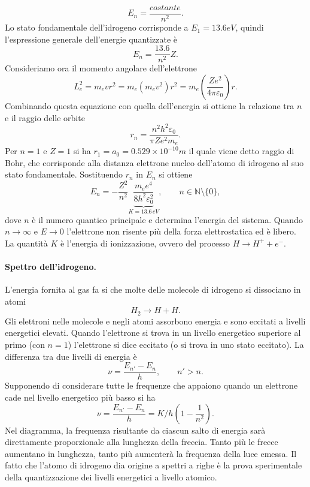 \begin{equation}
    E_n=\frac{costante}{n^2}.
\end{equation}
Lo stato fondamentale dell'idrogeno corrisponde a $E_1=13.6 eV$, quindi l'espressione generale dell'energie quantizzate è
\begin{equation}
    E_n=\frac{13.6}{n^2}Z.
\end{equation}
Consideriamo ora il momento angolare dell'elettrone
\begin{equation}
    L_e^2={m_evr}^2=m_e\left(m_ev^2\right)r^2=m_e\left(\frac{Ze^2}{4\pi\varepsilon_0}\right)r.
\end{equation}
Combinando questa equazione con quella dell'energia si ottiene la relazione tra $n$ e il raggio delle orbite
\begin{equation}
    r_n=\frac{n^2h^2\varepsilon_0}{\pi Ze^2m_e}.
\end{equation}
Per $n=1$ e $Z=1$ si ha $r_1=a_0=0.529\times10^{-10} m$ il quale viene detto raggio di Bohr, che corrisponde alla distanza elettrone nucleo dell'atomo di idrogeno al suo stato fondamentale. Sostituendo $r_n$ in $E_n$ si ottiene
\begin{equation}
    E_n=-\frac{Z^2}{n^2}\underbrace{\frac{m_ee^4}{8h^2\varepsilon_0^2}}_{K=13.6\,eV},\qquad n\in\mathbb{N}\setminus\{0\},
\end{equation}
dove $n$ è il numero quantico principale e determina l'energia del sistema. Quando $n\to\infty$ e $E\to0$ l'elettrone non risente più della forza elettrostatica ed è libero. La quantità $K$ è l'energia di ionizzazione, ovvero del processo $H\to H^+ + e^-$. 
\paragraph{Spettro dell'idrogeno.} L'energia fornita al gas fa si che molte delle molecole di idrogeno si dissociano in atomi
\begin{equation}
    H_2\to H+H.
\end{equation}
Gli elettroni nelle molecole e negli atomi assorbono energia e sono eccitati a livelli energetici elevati. Quando l'elettrone si trova in un livello energetico superiore al primo (con $n=1$) l'elettrone si dice eccitato (o si trova in uno stato eccitato). La differenza tra due livelli di energia è
\begin{equation}
    \nu=\frac{E_{n'}-E_n}{h},\qquad n'>n.
\end{equation}
Supponendo di considerare tutte le frequenze che appaiono quando un elettrone cade nel livello energetico più basso si ha
\begin{equation}
    \nu=\frac{E_{n'}-E_n}{h}=K/h \left(1-\frac{1}{n^2}\right).
\end{equation}
Nel diagramma, la frequenza risultante da ciascun salto di energia sarà direttamente proporzionale alla lunghezza della freccia. Tanto più le frecce aumentano in lunghezza, tanto più aumenterà la frequenza della luce emessa. Il fatto che l'atomo di idrogeno dia origine a spettri a righe è la prova sperimentale della quantizzazione dei livelli energetici a livello atomico.

